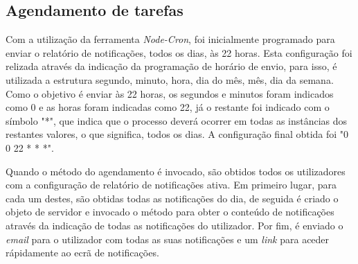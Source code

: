 \subsection{Agendamento de tarefas}

Com a utilização da ferramenta \textit{Node-Cron}, foi inicialmente programado para enviar o relatório de notificações, todos os dias, às 22 horas. Esta configuração foi relizada através da indicação da programação de horário de envio, para isso, é utilizada a estrutura segundo, minuto, hora, dia do mês, mês, dia da semana. Como o objetivo é enviar às 22 horas, os segundos e minutos foram indicados como 0 e as horas foram indicadas como 22, já o restante foi indicado com o símbolo "*", que indica que o processo deverá ocorrer em todas as instâncias dos restantes valores, o que significa, todos os dias. A configuração final obtida foi "0 0 22 * * *".

Quando o método do agendamento é invocado, são obtidos todos os utilizadores com a configuração de relatório de notificações ativa. Em primeiro lugar, para cada um destes, são obtidas todas as notificações do dia, de seguida é criado o objeto de servidor e invocado o método para obter o conteúdo de notificações através da indicação de todas as notificações do utilizador. Por fim, é enviado o \textit{email} para o utilizador com todas as suas notificações e um \textit{link} para aceder rápidamente ao ecrã de notificações.